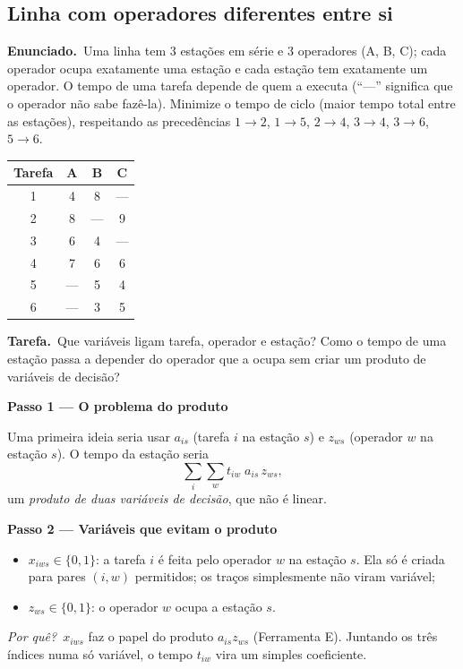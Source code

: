 \documentclass[11pt,a4paper]{article}
\newcommand{\enunciado}{\par\textbf{Enunciado.}\ }
\newcommand{\tarefa}{\par\textbf{Tarefa.}\ }
\newcommand{\passo}[1]{\par\medskip\textbf{#1}\par}
\newcommand{\porque}{\textit{Por quê?}\ }
\begin{document}
\subsection{Linha com operadores diferentes entre si}
\enunciado Uma linha tem 3 estações em série e 3 operadores (A, B, C); cada operador ocupa exatamente uma estação e
cada estação tem exatamente um operador. O tempo de uma tarefa depende de quem a executa (``---'' significa que o
operador não sabe fazê-la). Minimize o tempo de ciclo (maior tempo total entre as estações), respeitando as precedências
$1\to2$, $1\to5$, $2\to4$, $3\to4$, $3\to6$, $5\to6$.
\begin{center}
\begin{tabular}{cccc}
\toprule
Tarefa & A & B & C\\
\midrule
1 & 4 & 8 & ---\\
2 & 8 & --- & 9\\
3 & 6 & 4 & ---\\
4 & 7 & 6 & 6\\
5 & --- & 5 & 4\\
6 & --- & 3 & 5\\
\bottomrule
\end{tabular}
\end{center}
\tarefa Que variáveis ligam tarefa, operador e estação? Como o tempo de uma estação passa a depender do operador
que a ocupa sem criar um produto de variáveis de decisão?

\passo{Passo 1 --- O problema do produto}
Uma primeira ideia seria usar $a_{is}$ (tarefa $i$ na estação $s$) e $z_{ws}$ (operador $w$ na estação $s$). O tempo da
estação seria
\[
  \sum_i\sum_w t_{iw}\; a_{is}\,z_{ws},
\]
um \emph{produto de duas variáveis de decisão}, que não é linear.

\passo{Passo 2 --- Variáveis que evitam o produto}
\begin{itemize}
  \item $x_{iws}\in\{0,1\}$: a tarefa $i$ é feita pelo operador $w$ na estação $s$. Ela só é criada para pares $(i,w)$
        permitidos; os traços simplesmente não viram variável;
  \item $z_{ws}\in\{0,1\}$: o operador $w$ ocupa a estação $s$.
\end{itemize}
\porque $x_{iws}$ faz o papel do produto $a_{is}z_{ws}$ (Ferramenta E). Juntando os três índices numa só
variável, o tempo $t_{iw}$ vira um simples coeficiente.
\end{document}
